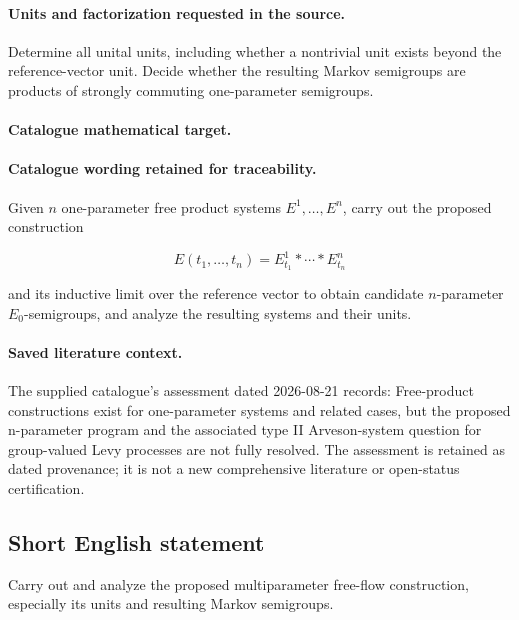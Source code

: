 \documentclass[11pt]{article}
\begin{document}
\paragraph{Units and factorization requested in the source.} Determine all unital units, including whether a nontrivial unit exists beyond the reference-vector unit. Decide whether the resulting Markov semigroups are products of strongly commuting one-parameter semigroups.

\paragraph{Catalogue mathematical target.}
\paragraph{Catalogue wording retained for traceability.}
Given $n$ one-parameter free product systems $E^1,\ldots,E^n$, carry out the proposed construction

$$E(t_1,\ldots,t_n)=E^1_{t_1}*\cdots*E^n_{t_n}$$

and its inductive limit over the reference vector to obtain candidate $n$-parameter $E_0$-semigroups, and analyze the resulting systems and their units.

\paragraph{Saved literature context.} The supplied catalogue's assessment dated 2026-08-21 records: Free-product constructions exist for one-parameter systems and related cases, but the proposed n-parameter program and the associated type II Arveson-system question for group-valued Levy processes are not fully resolved. The assessment is retained as dated provenance; it is not a new comprehensive literature or open-status certification.
\subsection{Short English statement}
Carry out and analyze the proposed multiparameter free-flow construction, especially its units and resulting Markov semigroups.
\end{document}
